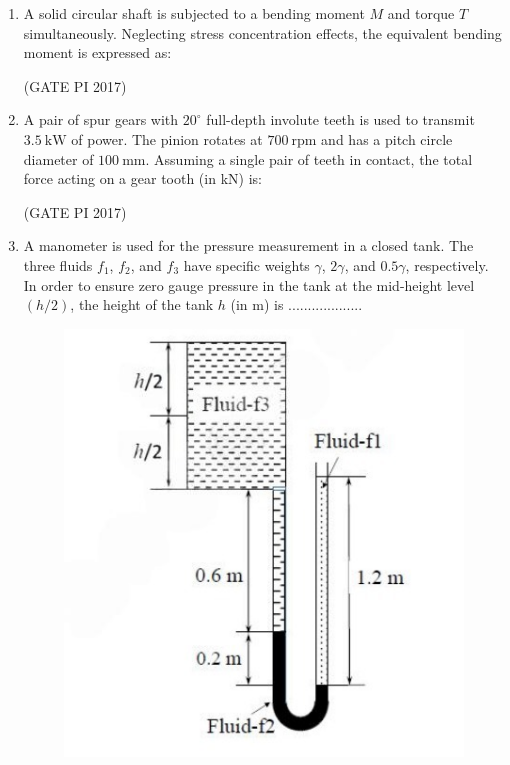 \documentclass[journal,12pt,onecolumn]{IEEEtran}
\theoremstyle{remark}
\begin{document}
\begin{enumerate}
\item A solid circular shaft is subjected to a bending moment $M$ and torque $T$ simultaneously. Neglecting stress concentration effects,  
the equivalent bending moment is expressed as:
\begin{enumerate}
\end{enumerate}
\hfill (GATE PI 2017)

\item A pair of spur gears with $20^\circ$ full\--depth involute teeth is used to transmit $3.5 \ \text{kW}$ of power.  
The pinion rotates at $700 \ \text{rpm}$ and has a pitch circle diameter of $100 \ \text{mm}$.  
Assuming a single pair of teeth in contact, the total force acting on a gear tooth (in kN) is:
\begin{enumerate}
\end{enumerate}
\hfill (GATE PI 2017)

\item A manometer is used for the pressure measurement in a closed tank. The three fluids $f_1$, $f_2$, and $f_3$  
have specific weights $\gamma$, $2\gamma$, and $0.5\gamma$, respectively.  
In order to ensure zero gauge pressure in the tank at the mid\--height level $(h/2)$, the height of the tank $h$ (in m) is ...................

\begin{figure}[h]
    \centering
    \includegraphics[width=0.4\linewidth]{fig5.png}
    \caption{}
    \label{fig:placeholder}
\end{figure}


\end{enumerate}
\end{document}
